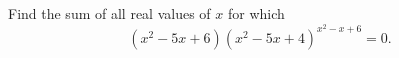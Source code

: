 Find the sum of all real values of $x$ for which
\[
\left(x^2-5x+6\right)\left(x^2-5x+4\right)^{x^2-x+6}=0 .
\]
